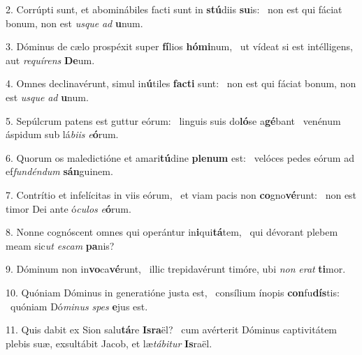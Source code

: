 2. Corrúpti sunt, et abominábiles facti sunt in \textbf{stú}diis \textbf{su}is: \ast\  non est qui fáciat bonum, non est \textit{us}\textit{que} \textit{ad} \textbf{u}num.\

3. Dóminus de cælo prospéxit super \textbf{fí}lios \textbf{hó}\textbf{mi}num, \ast\  ut vídeat si est intélligens, aut \textit{re}\textit{quí}\textit{rens} \textbf{De}um.\

4. Omnes declinavérunt, simul in\textbf{ú}tiles \textbf{fac}\textbf{ti} sunt: \ast\  non est qui fáciat bonum, non est \textit{us}\textit{que} \textit{ad} \textbf{u}num.\

5. Sepúlcrum patens est guttur eórum: \dag\  linguis suis do\textbf{ló}se a\textbf{gé}bant \ast\  venénum áspidum sub lá\textit{bi}\textit{is} \textit{e}\textbf{ó}rum.\

6. Quorum os maledictióne et amari\textbf{tú}dine \textbf{ple}\textbf{num} est: \ast\  velóces pedes eórum ad ef\textit{fun}\textit{dén}\textit{dum} \textbf{sán}guinem.\

7. Contrítio et infelícitas in viis eórum, \dag\  et viam pacis non \textbf{co}gno\textbf{vé}runt: \ast\  non est timor Dei ante ó\textit{cu}\textit{los} \textit{e}\textbf{ó}rum.\

8. Nonne cognóscent omnes qui operántur in\textbf{i}qui\textbf{tá}tem, \ast\  qui dévorant plebem meam sic\textit{ut} \textit{es}\textit{cam} \textbf{pa}nis?\

9. Dóminum non in\textbf{vo}ca\textbf{vé}runt, \ast\  illic trepidavérunt timóre, ubi \textit{non} \textit{e}\textit{rat} \textbf{ti}mor.\

10. Quóniam Dóminus in generatióne justa est, \dag\  consílium ínopis \textbf{con}fu\textbf{dís}tis: \ast\  quóniam Dó\textit{mi}\textit{nus} \textit{spes} \textbf{e}jus est.\

11. Quis dabit ex Sion salu\textbf{tá}re \textbf{Is}\textbf{ra}ël? \ast\  cum avérterit Dóminus captivitátem plebis suæ, exsultábit Jacob, et læ\textit{tá}\textit{bi}\textit{tur} \textbf{Is}raël.\

